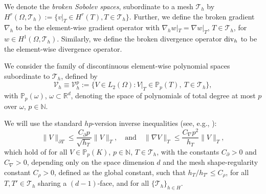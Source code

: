 \documentclass{amsart}
\newcommand{\norm}[2]{\|{#1}\|_{{#2}}}
\newcommand{\jump}[1]{[\kern-0.6mm [{#1}]\kern-0.6mm]}
\newcommand{\av}[1]{\{\kern-1.2mm \{{#1}\}\kern-1.2mm\}}
\newcommand{\Th}{\mathcal{T}_h}
\newcommand{\Div}{{\rm div}}
\newcommand{\cinvT}{C_{\partial}}
\newcommand{\cinv}{C_{\nabla}}
\theoremstyle{definition}
\theoremstyle{remark}
\numberwithin{equation}{section}
\begin{document}
We  {denote the \emph{broken Sobolev spaces}, subordinate to a mesh $\Th$ by
$
H^r(\Omega,\Th ):=\{v|_T\in H^r(T), T\in\Th \}.
$}
Further, we define the broken gradient $\nabla_h $ to be the element-wise gradient operator with $\nabla_hw|_T=\nabla w|_T$, $T\in\Th $, for $w\in H^1(\Omega,\Th )$. Similarly, we define the broken divergence operator $\Div_h$ to be the element-wise divergence operator.



We consider the family of discontinuous element-wise polynomial spaces subordinate to $\Th $, defined by
\[
 {\mathcal{V}}_h\equiv  {\mathcal{V}}_h^p:=\{V\in L_2(\Omega): V|_T\in \mathbb{P}_p(T),\ T\in\Th \},
\]
with $\mathbb{P}_p(\omega)$, $\omega\subset\mathbb{R}^d$, denoting the space of polynomials of total degree at most $p$ over $\omega$, $p\in\mathbb{N}$.

We will use the standard $hp$-version inverse inequalities (see, e.g., \cite{schwab}):
\begin{equation}\label{trace_H1_inv}
\|V\|_{\partial T} \leq \frac{\cinvT p}{ \sqrt{h_T}}  \|V\|_{ T},
 \quad\text{and}\quad
\|\nabla V\|_{T} \leq  \frac{\cinv p^2}{h_T}  \|V\|_{ T},
\end{equation}
which hold of for all $V\in\mathbb{P}_p(K)$, $p\in\mathbb{N}$, $T\in\Th $,
with the constants $\cinvT>0$ and $\cinv>0$, depending only on the space dimension $d$ and  the mesh shape-regularity constant $C_\rho>0$, defined as the global constant, such that $h_{T}/h_{T'}\le C_{\rho}$,
for all $T,T'\in\Th$ sharing a $(d-1)$-face, and for all $\{\Th\}_{h\in H}$.
\end{document}
